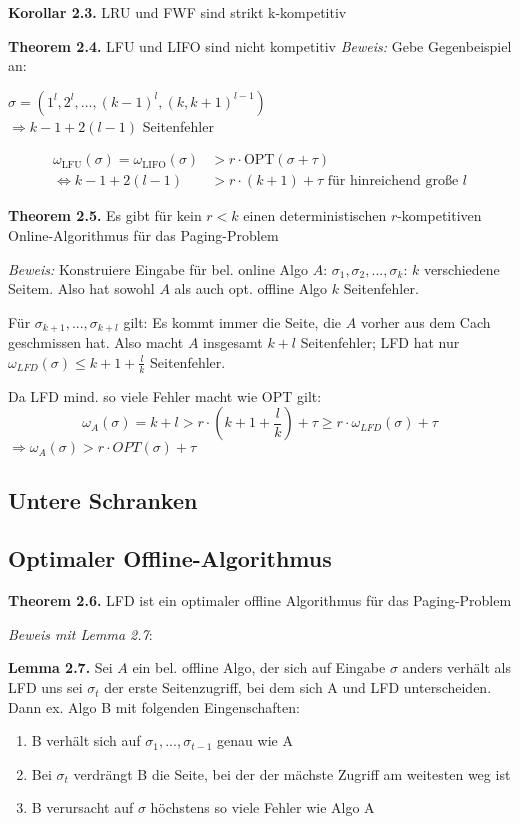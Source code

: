 \textbf{Korollar 2.3.} LRU und FWF sind strikt k-kompetitiv



\textbf{Theorem 2.4.} LFU und LIFO sind nicht kompetitiv
\textit{Beweis:} Gebe Gegenbeispiel an:

$\sigma = \left(1^l, 2^l, ..., (k-1)^l, (k, k+1)^{l-1}\right)$\\
$\Rightarrow k - 1 + 2(l - 1)$ Seitenfehler

\begin{align*}
\omega_{\textrm{LFU}}(\sigma) = \omega_{\textrm{LIFO}}(\sigma) &> r \cdot \textrm{OPT}(\sigma + \tau)\\
\Leftrightarrow k - 1 + 2 (l - 1) &> r \cdot (k + 1) + \tau \textrm{ für hinreichend große } l
\end{align*}



\textbf{Theorem 2.5.} Es gibt für kein $r<k$ einen deterministischen $r$-kompetitiven Online-Algorithmus für das Paging-Problem

\textit{Beweis:} Konstruiere Eingabe für bel. online Algo $A$: $\sigma_{1}, \sigma_{2}, ..., \sigma_{k}$: $k$ verschiedene Seitem. Also hat sowohl $A$ als auch opt. offline Algo $k$ Seitenfehler.

Für $\sigma_{k + 1}, ..., \sigma_{k + l}$ gilt: Es kommt immer die Seite, die $A$ vorher aus dem Cach geschmissen hat. Also macht $A$ insgesamt $k + l$ Seitenfehler; LFD hat nur $\omega_{LFD}(\sigma) \le k + 1 + \frac{l}{k}$ Seitenfehler.

Da LFD mind. so viele Fehler macht wie OPT gilt: $$\omega_{A}(\sigma) = k + l > r \cdot ( k + 1 + \frac{l}{k}) + \tau \ge r \cdot \omega_{LFD}(\sigma) + \tau$$
$\Rightarrow \omega_{A}(\sigma) > r \cdot OPT(\sigma) + \tau$


\subsection{Untere Schranken}


\subsection{Optimaler Offline-Algorithmus}

\textbf{Theorem 2.6.} LFD ist ein optimaler offline Algorithmus für das Paging-Problem

\textit{Beweis mit Lemma 2.7}:

\textbf{Lemma 2.7.} Sei $A$ ein bel. offline Algo, der sich auf Eingabe $\sigma$ anders verhält als LFD uns sei $\sigma_{t}$ der erste Seitenzugriff, bei dem sich A und LFD unterscheiden. Dann ex. Algo B mit folgenden Eingenschaften:
\begin{enumerate}
\item B verhält sich auf $\sigma_{1}, ..., \sigma_{t - 1}$ genau wie A
\item Bei $\sigma_{t}$ verdrängt B die Seite, bei der der mächste Zugriff am weitesten weg ist
\item B verursacht auf $\sigma$ höchstens so viele Fehler wie Algo A
\end{enumerate}

